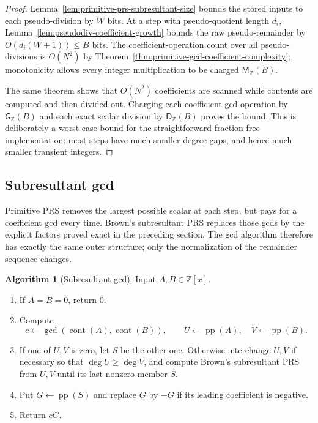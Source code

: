 \documentclass[11pt]{book}
\theoremstyle{definition}
\newtheorem{algorithm}[theorem]{Algorithm}
\newcommand{\ZZ}{\mathbb Z}
\newcommand{\MZ}{\mathsf M_{\ZZ}}
\begin{document}
\begin{proof}
Lemma~\ref{lem:primitive-prs-subresultant-size} bounds the stored inputs to each
pseudo-division by $W$ bits.  At a step with pseudo-quotient length $d_i$,
Lemma~\ref{lem:pseudodiv-coefficient-growth} bounds the raw pseudo-remainder by
$O(d_i(W+1))\le B$ bits.  The coefficient-operation count over all
pseudo-divisions is $O(N^2)$ by
Theorem~\ref{thm:primitive-gcd-coefficient-complexity}; monotonicity allows
every integer multiplication to be charged $\MZ(B)$.

The same theorem shows that $O(N^2)$ coefficients are scanned while contents
are computed and then divided out.  Charging each coefficient-gcd operation by
$\mathsf G_{\ZZ}(B)$ and each exact scalar division by
$\mathsf D_{\ZZ}(B)$ proves the bound.  This is deliberately a worst-case
bound for the straightforward fraction-free implementation: most steps have
much smaller degree gaps, and hence much smaller transient integers.
\end{proof}

\subsection{Subresultant gcd}\label{subsec:subresultant-gcd}

Primitive PRS removes the largest possible scalar at each step, but pays for a
coefficient gcd every time.  Brown's subresultant PRS replaces those gcds by
the explicit factors proved exact in the preceding section.  The gcd algorithm
therefore has exactly the same outer structure; only the normalization of the
remainder sequence changes.

\begin{algorithm}[Subresultant gcd]
\label{alg:subresultant-gcd}
Input $A,B\in\ZZ[x]$.
\begin{enumerate}
 \item If $A=B=0$, return $0$.
 \item Compute
 \[
  c\leftarrow\gcd(\operatorname{cont}(A),\operatorname{cont}(B)),
  \qquad
  U\leftarrow\operatorname{pp}(A),
  \quad
  V\leftarrow\operatorname{pp}(B).
 \]
 \item If one of $U,V$ is zero, let $S$ be the other one.  Otherwise interchange
 $U,V$ if necessary so that $\deg U\ge\deg V$, and compute Brown's
 subresultant PRS from $U,V$ until its last nonzero member $S$.
 \item Put $G\leftarrow\operatorname{pp}(S)$ and replace $G$ by $-G$ if its
 leading coefficient is negative.
 \item Return $cG$.
\end{enumerate}
\end{algorithm}
\end{document}
